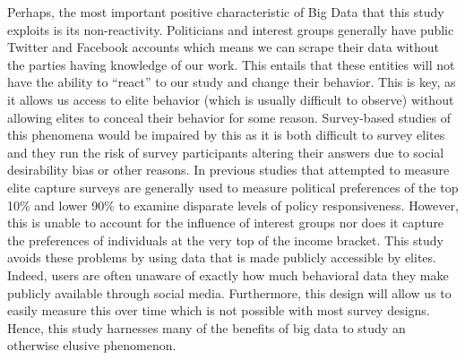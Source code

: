 \documentclass[dvips,12pt]{article}
\begin{document}
 Perhaps, the most important positive characteristic of Big Data that this study exploits is its non-reactivity. Politicians and interest groups generally have public Twitter and Facebook accounts which means we can scrape their data without the parties having knowledge of our work. This entails that these entities will not have the ability to “react” to our study and change their behavior. This is key, as it allows us access to elite behavior (which is usually difficult to observe) without allowing elites to conceal their behavior for some reason. Survey-based studies of this phenomena would be impaired by this as it is both difficult to survey elites and they run the risk of survey participants altering their answers due to social desirability bias or other reasons.\cite{RefWorks:doc:59e2931fe4b0b4635e033b19} In previous studies that attempted to measure elite capture surveys are generally used to measure political preferences of the top 10\% and lower 90\% to examine disparate levels of policy responsiveness. However, this is unable to account for the influence of interest groups nor does it capture the preferences of individuals at the very top of the income bracket. This study avoids these problems by using data that is made publicly accessible by elites. Indeed, users are often unaware of exactly how much behavioral data they make publicly available through social media.  Furthermore, this design will allow us to easily measure this over time which is not possible with most survey designs.  Hence, this study harnesses many of the benefits of big data to study an otherwise elusive phenomenon. 
\end{document}
